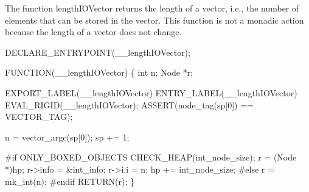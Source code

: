\nwendcode{}\nwdocspar
The function {\Tt{}lengthIOVector\nwendquote} returns the length of a vector, i.e.,
the number of elements that can be stored in the vector. This function
is not a monadic action because the length of a vector does not
change.

\nwenddocs{}\plusendmoddef\nwstartdeflinemarkup{}\nwenddeflinemarkup
DECLARE_ENTRYPOINT(__lengthIOVector);

FUNCTION(__lengthIOVector)
\{
    int  n;
    Node *r;

    EXPORT_LABEL(__lengthIOVector)
 ENTRY_LABEL(__lengthIOVector)
    EVAL_RIGID(__lengthIOVector);
    ASSERT(node_tag(sp[0]) == VECTOR_TAG);

    n   = vector_argc(sp[0]);
    sp += 1;

#if ONLY_BOXED_OBJECTS
    CHECK_HEAP(int_node_size);
    r       = (Node *)hp;
    r->info = &int_info;
    r->i.i  = n;
    hp     += int_node_size;
#else
    r = mk_int(n);
#endif
    RETURN(r);
\}
\nwendcode{}

%

